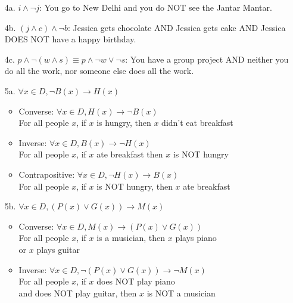 {\begin{enumerate}
    \item[4a.]  $i \land \neg j$: You go to New Delhi and you do NOT see the Jantar Mantar.
    \item[4b.]  $(j \land c) \land \neg b$: Jessica gets chocolate AND Jessica gets cake AND
                Jessica DOES NOT have a happy birthday.
    \item[4c.]  $p \land \neg (w \land s) \equiv p \land \neg w \lor \neg s$: You have a group project AND
                neither you do all the work, nor someone else does all the work.

    \item[5a.]  $\forall x \in D, \neg B(x) \to H(x)$
            \begin{itemize}
                \item Converse:
                        $\forall x \in D, H(x) \to \neg B(x)$      \\
                        For all people $x$, if $x$ is hungry, then $x$ didn't eat breakfast     
                
                \item Inverse:
                        $\forall x \in D, B(x) \to \neg H(x)$      \\
                        For all people $x$, if $x$ ate breakfast then $x$ is NOT hungry     
                
                \item Contrapositive:
                        $\forall x \in D, \neg H(x) \to B(x)$      \\
                        For all people $x$, if $x$ is NOT hungry, then $x$ ate breakfast     
            \end{itemize}
    \item[5b.] $\forall x \in D, (P(x) \lor G(x)) \to M(x)$
            \begin{itemize}
                \item Converse:
                        $\forall x \in D, M(x) \to (P(x) \lor G(x))$      \\
                        For all people $x$, if $x$ is a musician, then $x$ plays piano \\
                        or $x$ plays guitar     
                
                \item Inverse:
                        $\forall x \in D, \neg (P(x) \lor G(x)) \to \neg M(x)$      \\
                        For all people $x$, if $x$ does NOT play piano \\
                        and does NOT play guitar,
                        then $x$ is NOT a musician     
                

\end{itemize}
\end{enumerate}}
